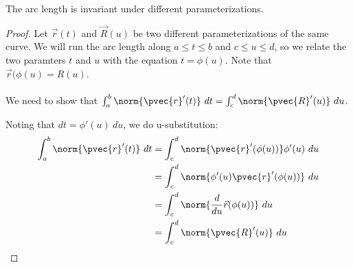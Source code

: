 \documentclass[12pt]{article}
\begin{document}
\begin{theorem}
The arc length is invariant under different parameterizations.
\end{theorem}

\begin{proof}
Let $\vec{r}(t)$ and $\vec{R}(u)$ be two different parameterizations of the same curve. We will run the arc length along $a \le t \le b$ and $c \le u \le d$, so we relate the two paramters $t$ and $u$ with the equation $t = \phi(u)$. Note that $\vec{r}(\phi(u) = R(u)$. \\ \\
We need to show that $\int_a^b\norm{\pvec{r}'(t)} \ dt = \int_c^d\norm{\pvec{R}'(u)} \ du$.

Noting that $dt = \phi'(u) \ du$, we do u-substitution:
\[
\begin{aligned}
\int_a^b\norm{\pvec{r}'(t)} \ dt &= \int_c^d\norm{\pvec{r}'(\phi(u))} \phi'(u) \ du \\
&= \int_c^d\norm{\phi'(u)\pvec{r}'(\phi(u))} \ du \\
&= \int_c^d\norm{\frac{d}{du}\vec{r}(\phi(u))} \ du \\
&= \int_c^d\norm{\pvec{R}'(u)} \ du
\end{aligned}
\]
\end{proof}
\newpage
\end{document}
